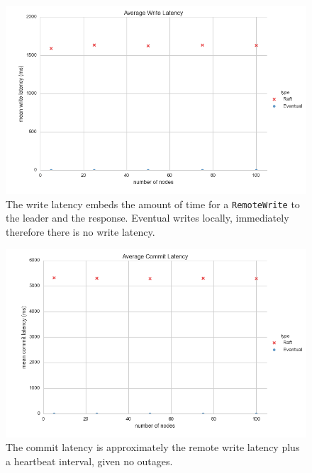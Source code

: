 \documentclass[11pt,letterpaper]{article}
\begin{document}
\begin{figure}[!h]
    \centering
        \includegraphics[width=\textwidth]{figures/write_latency.png}
        \caption{\textsf{The write latency embeds the amount of time for a \texttt{RemoteWrite} to the leader and the response. Eventual writes locally, immediately therefore there is no write latency.}}
        \label{fig:write_latency}
\end{figure}

\begin{figure}[!h]
    \centering
        \includegraphics[width=\textwidth]{figures/commit_latency.png}
        \caption{\textsf{The commit latency is approximately the remote write latency plus a heartbeat interval, given no outages.}}
        \label{fig:commit_latency}
\end{figure}
\end{document}

